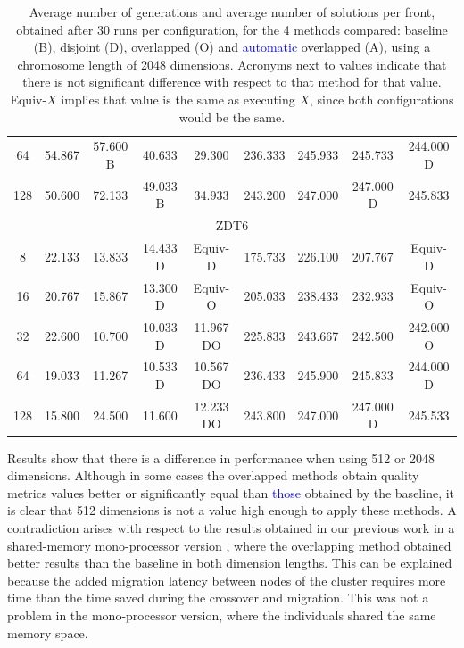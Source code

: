 \documentclass[preprint]{elsarticle}
\begin{document}
\begin{table}
{\begin{tabular}{|c||c|c|c|c||c|c|c|c||}
64	&	54.867		&	57.600	B	&	40.633			&	29.300			&	236.333		&	245.933			&	245.733			&	244.000	D			\\
128	&	50.600		&	72.133		&	49.033	B		&	34.933			&	243.200		&	247.000			&	247.000	D		&	245.833				\\ \hline
\multicolumn{9}{|c|}{ZDT6}																															\\ \hline
8	&	22.133		&	13.833		&	14.433	D		&	Equiv-D			&	175.733		&	226.100			&	207.767			&	Equiv-D				\\
16	&	20.767		&	15.867		&	13.300	D		&	Equiv-O			&	205.033		&	238.433			&	232.933			&	Equiv-O				\\
32	&	22.600		&	10.700		&	10.033	D		&	11.967	DO		&	225.833		&	243.667			&	242.500			&	242.000	O			\\
64	&	19.033		&	11.267		&	10.533	D		&	10.567	DO		&	236.433		&	245.900			&	245.833			&	244.000	D			\\
128	&	15.800		&	24.500		&	11.600			&	12.233	DO		&	243.800		&	247.000			&	247.000	D		&	245.533				\\ \hline
\end{tabular}
}
\caption{Average number of generations and average number of solutions per front, obtained after 30 runs per configuration, for the 4 methods compared: baseline (B), disjoint (D), overlapped (O) and \textcolor{blue}{automatic} overlapped (A), using a chromosome length of 2048 dimensions. Acronyms next to values indicate that there is not significant difference with respect to that method for that value. Equiv-$X$ implies that value is the same as executing $X$, since both configurations would be the same.}
\label{tab:sols2048}
\end{table}

Results show that there is a difference in performance when using 512 or 2048 dimensions. Although in some cases the overlapped methods obtain quality metrics values better or significantly equal than \textcolor{blue}{those} obtained by the baseline, it is clear that 512 dimensions is not a value high enough to apply these methods. A contradiction arises with respect to the results obtained in our previous work in a shared-memory mono-processor version \citep{Garcia16hpmoon}, where the overlapping method obtained better results than the baseline in both dimension lengths. This can be explained because the added migration latency between nodes of the cluster requires more time than the time saved during the crossover and migration. This was not a problem in the mono-processor version, where the individuals shared the same memory space.
\end{document}
